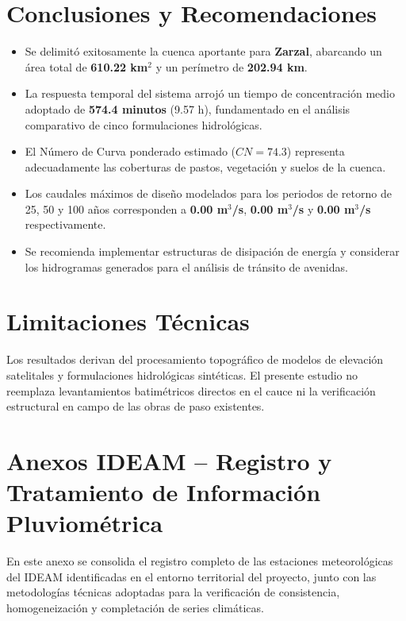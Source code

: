 \documentclass[11pt,a4paper]{article}
\begin{document}
\section{Conclusiones y Recomendaciones}
\begin{itemize}
\item Se delimitó exitosamente la cuenca aportante para \textbf{Zarzal}, abarcando un área total de \textbf{610.22 km$^2$} y un perímetro de \textbf{202.94 km}.
\item La respuesta temporal del sistema arrojó un tiempo de concentración medio adoptado de \textbf{574.4 minutos} (9.57 h), fundamentado en el análisis comparativo de cinco formulaciones hidrológicas.
\item El Número de Curva ponderado estimado ($CN = 74.3$) representa adecuadamente las coberturas de pastos, vegetación y suelos de la cuenca.
\item Los caudales máximos de diseño modelados para los periodos de retorno de 25, 50 y 100 años corresponden a \textbf{0.00 m$^3$/s}, \textbf{0.00 m$^3$/s} y \textbf{0.00 m$^3$/s} respectivamente.
\item Se recomienda implementar estructuras de disipación de energía y considerar los hidrogramas generados para el análisis de tránsito de avenidas.
\end{itemize}

\section{Limitaciones Técnicas}
Los resultados derivan del procesamiento topográfico de modelos de elevación satelitales y formulaciones hidrológicas sintéticas. El presente estudio no reemplaza levantamientos batimétricos directos en el cauce ni la verificación estructural en campo de las obras de paso existentes.

\newpage
\section{Anexos IDEAM -- Registro y Tratamiento de Información Pluviométrica}
En este anexo se consolida el registro completo de las estaciones meteorológicas del IDEAM identificadas en el entorno territorial del proyecto, junto con las metodologías técnicas adoptadas para la verificación de consistencia, homogeneización y completación de series climáticas.
\end{document}
